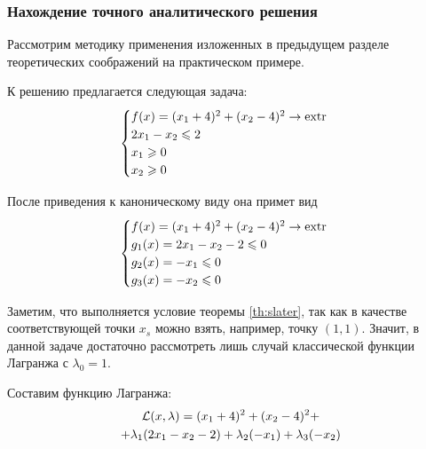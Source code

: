 \clearpage
\subsubsection{Нахождение точного аналитического решения}
\label{sec:kuhn-tucker-solution}

Рассмотрим методику применения изложенных в предыдущем разделе
теоретических соображений на практическом примере.

К решению предлагается следующая задача:
\begin{equation}
  \label{eq:cond-optim-problem-raw}
  \begin{cases}
    f(x) = (x_1+4)^2 + (x_2-4)^2 \to \operatorname{extr} \\
    2x_1 - x_2 \leqslant 2 \\
    x_1 \geqslant 0 \\
    x_2 \geqslant 0
  \end{cases}
\end{equation}

После приведения к каноническому виду она примет вид
\begin{equation}
  \label{eq:cond-optim-problem}
  \begin{cases}
    f(x) = (x_1+4)^2 + (x_2-4)^2 \to \operatorname{extr} \\
    g_1(x) = 2x_1 - x_2 - 2 \leqslant 0 \\
    g_2(x) = -x_1 \leqslant 0 \\
    g_3(x) = -x_2 \leqslant 0
  \end{cases}
\end{equation}

Заметим, что выполняется условие теоремы \ref{th:slater}, так как в
качестве соответствующей точки $x_s$ можно взять, например, точку $(1,
1)$. Значит, в данной задаче достаточно рассмотреть лишь случай
классической функции Лагранжа с $\lambda_0=1$.

Составим функцию Лагранжа:
\begin{multline}
  \label{eq:lagrange}
  \mathcal{L}(x, \lambda) = (x_1+4)^2 + (x_2-4)^2 +\\
  + \lambda_1(2x_1-x_2-2)+\lambda_2(-x_1)+\lambda_3(-x_2)
\end{multline}

